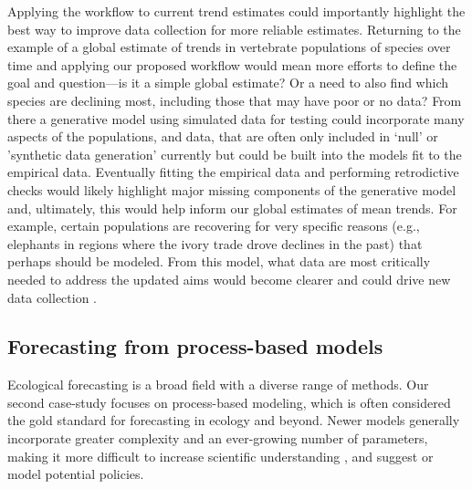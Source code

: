 \documentclass[11pt]{article}
\begin{document}
Applying the workflow to current trend estimates could importantly highlight the best way to improve data collection for more reliable estimates. Returning to the example of a global estimate of trends in vertebrate populations of species over time and applying our proposed workflow would mean more efforts to define the goal and question---is it a simple global estimate? %
Or a need to also find which species are declining most, including those that may have poor or no data? From there a generative model using simulated data for testing could incorporate many aspects of the populations, and data, that are often only included in `null' or 'synthetic data generation' currently \citep{Buschke2021,mcrae2025utility} but could be built into the models fit to the empirical data. Eventually fitting the empirical data and performing retrodictive checks would likely highlight major missing components of the generative model and, ultimately, this would help inform our global estimates of mean trends. For example, certain populations are recovering for very specific reasons (e.g., elephants in regions where the ivory trade drove declines in the past) that perhaps should be modeled. From this model, what data are most critically needed to address the updated aims would become clearer and could drive new data collection \citep{toszogyova2024mathematical}. 

\subsection{Forecasting from process-based models}

Ecological forecasting is a broad field with a diverse range of methods. Our second case-study focuses on process-based modeling, which is often considered the gold standard for forecasting in ecology \citep{Urban2016, Pilowsky2022} and beyond. Newer models generally incorporate greater complexity and an ever-growing number of parameters, making it more difficult to increase scientific understanding \citep{Franklin2020}, and suggest or model potential policies. 
\end{document}
